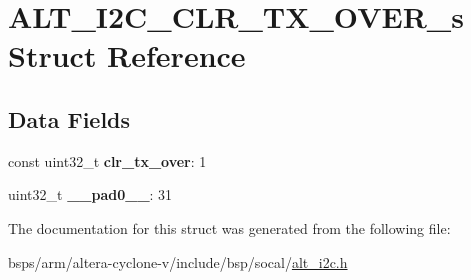 \hypertarget{structALT__I2C__CLR__TX__OVER__s}{}\section{A\+L\+T\+\_\+\+I2\+C\+\_\+\+C\+L\+R\+\_\+\+T\+X\+\_\+\+O\+V\+E\+R\+\_\+s Struct Reference}
\label{structALT__I2C__CLR__TX__OVER__s}
\subsection*{Data Fields}
\begin{DoxyCompactItemize}
\item 
\mbox{\label{structALT__I2C__CLR__TX__OVER__s_add00bcab804b24fe775527ce85d2bd00}} 
const uint32\+\_\+t {\bfseries clr\+\_\+tx\+\_\+over}\+: 1
\item 
\mbox{\label{structALT__I2C__CLR__TX__OVER__s_aa0abe90be40b7f6a516b491c3a0b2026}} 
uint32\+\_\+t {\bfseries \+\_\+\+\_\+pad0\+\_\+\+\_\+}\+: 31
\end{DoxyCompactItemize}


The documentation for this struct was generated from the following file\+:\begin{DoxyCompactItemize}
\item 
bsps/arm/altera-\/cyclone-\/v/include/bsp/socal/\mbox{\hyperlink{socal_2alt__i2c_8h}{alt\+\_\+i2c.\+h}}\end{DoxyCompactItemize}
